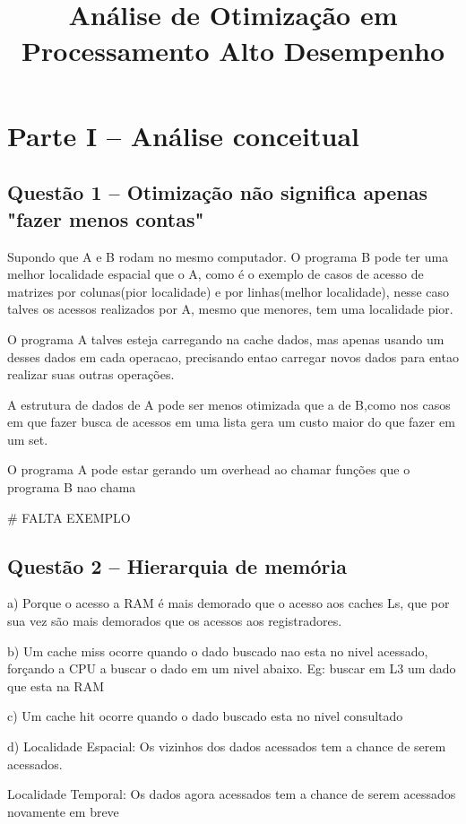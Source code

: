 \documentclass[12pt]{article}
\title{\\Análise de Otimização em Processamento Alto Desempenho}
\begin{document}
\maketitle

\section*{Parte I -- Análise conceitual}

\subsection*{Questão 1 -- Otimização não significa apenas "fazer menos contas"}

Supondo que A e B rodam no mesmo computador. O programa B pode ter uma melhor localidade espacial que o A, como é o exemplo de casos de acesso de matrizes por colunas(pior localidade) e por linhas(melhor localidade), nesse caso talves os acessos realizados por A, mesmo que menores, tem uma localidade pior.

O programa A talves esteja carregando na cache dados, mas apenas usando um desses dados em cada operacao, precisando entao carregar novos dados para entao realizar suas outras operações.

A estrutura de dados de A pode ser menos otimizada que a de B,como nos casos em que fazer busca de acessos em uma lista gera um custo maior do que fazer em um set.

O programa A pode estar gerando um overhead ao chamar funções que o programa B nao chama

\# FALTA EXEMPLO

\subsection*{Questão 2 -- Hierarquia de memória}
a) Porque o acesso a RAM é mais demorado que o acesso aos caches Ls, que por sua vez são mais demorados que os acessos aos registradores.

b) Um cache miss ocorre quando o dado buscado nao esta no nivel acessado, forçando a CPU a buscar o dado em um nivel abaixo. Eg: buscar em L3 um dado que esta na RAM

c) Um cache hit ocorre quando o dado buscado esta no nivel consultado

d) Localidade Espacial: Os vizinhos dos dados acessados tem a chance de serem acessados.

Localidade Temporal: Os dados agora acessados tem a chance de serem acessados novamente em breve
\end{document}
